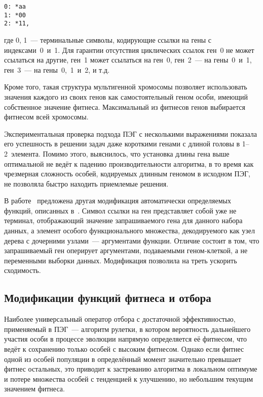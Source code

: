 \begin{samepage}
\begin{verbatim}
0: *aa
1: *00
2: *11,
\end{verbatim}
\end{samepage}

где 0, 1~--- терминальные символы, кодирующие ссылки на гены с индексами~0~и~1. Для гарантии отсутствия циклических ссылок ген~0 не может ссылаться на другие, ген~1 может ссылаться на ген~0, ген~2~--- на гены~0~и~1, ген~3~--- на гены~0,~1~и~2, и т.д.

Кроме того, такая структура мультигенной хромосомы позволяет использовать значения каждого из своих генов как самостоятельный геном особи, имеющий собственное значение фитнеса. Максимальный из фитнесов генов выбирается фитнесом всей хромосомы.

Экспериментальная проверка подхода ПЭГ с несколькими выражениями показала его успешность в решении задач даже короткими генами с длиной головы в 1--2~элемента. Помимо этого, выяснилось, что установка длины гена выше оптимальной не ведёт к падению производительности алгоритма, в то время как чрезмерная сложность особей, кодируемых длинным геномом в исходном ПЭГ, не позволяла быстро находить приемлемые решения.

В работе~\cite{Li:2008:GNF:1473248.1474006} предложена другая модификация автоматически определяемых функций, описанных в~\cite{Ferreira:2006:GSP}. Символ ссылки на ген представляет собой уже не терминал, отображающий значение запрашиваемого гена для данного набора данных, а элемент особого функционального множества, декодируемого как узел дерева с дочерними узлами~--- аргументами функции. Отличие состоит в том, что запрашиваемый ген оперирует аргументами, подаваемыми геном-клеткой, а не переменными выборки данных. Модификация позволила на треть ускорить сходимость.


\subsection{Модификации функций фитнеса и отбора}

Наиболее универсальный оператор отбора с достаточной эффективностью, применяемый в ПЭГ~--- алгоритм рулетки, в котором вероятность дальнейшего участия особи в процессе эволюции напрямую определяется её фитнесом, что ведёт к сохранению только особей с высоким фитнесом. Однако если фитнес одной из особей популяции в определённый момент значительно превышает фитнес остальных, это приводит к застреванию алгоритма в локальном оптимуме и потере множества особей с тенденцией к улучшению, но небольшим текущим значением фитнеса.

